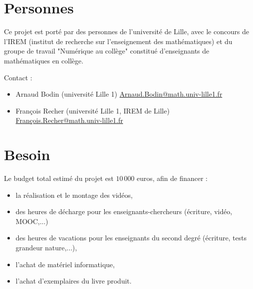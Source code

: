 \documentclass[class=report,crop=false, 12pt]{standalone}
\begin{document}
\section{Personnes}

Ce projet est porté par des personnes de l'université de Lille, avec le concours de l'IREM  (institut de recherche sur l'enseignement des mathématiques) et du groupe de travail "Numérique au collège" constitué d'enseignants de mathématiques en collège.

\bigskip

Contact :
\begin{itemize}
  \item Arnaud Bodin (université Lille 1) \href{mailto:Arnaud.Bodin@math.univ-lille1.fr}{Arnaud.Bodin@math.univ-lille1.fr}
  
  \item François Recher (université Lille 1, IREM de Lille) \href{mailto:Francois.Rechern@math.univ-lille1.fr}{François.Recher@math.univ-lille1.fr}
\end{itemize}


\section{Besoin}

Le budget total estimé du projet est $10\, 000$ euros, afin de financer :
\begin{itemize}
  \item la réalisation et le montage des vidéos,
  \item des heures de décharge pour les enseignants-chercheurs (écriture, vidéo, MOOC,...)
  \item des heures de vacations pour les enseignants du second degré (écriture, tests grandeur nature,...),
  \item l'achat de matériel informatique,
  \item l'achat d'exemplaires du livre produit.
\end{itemize}
\end{document}
